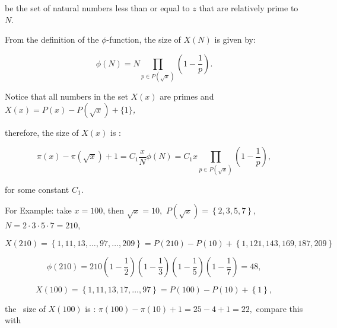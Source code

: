 \documentclass{aomart}
\begin{document}
be the set of natural numbers less than or equal to \(z\) that are relatively prime to \(N\).

\vspace{1\baselineskip}

From the definition of the \( \phi \)-function, the size of \( X(N) \) is given by:

\begin{equation}
\phi\left(N\right) = N\prod_{p\in P\left(\sqrt{x}\right)}^{}(1-\frac{1}{p} )  .
\end{equation}
\vspace{1\baselineskip}

 Notice that all numbers in the set \( X\left(x\right)\) are primes and \( X\left(x\right) = P\left(x\right)- P\left(\sqrt{x}\right)+\{ 1\}\)\textit{,}

 therefore, the { size of }\( X\left(x\right)\) is {:}

\begin{equation}
\pi\left(x\right)-\pi\left(\sqrt{x}\right)+1 = C_{1}\frac{x}{N} \phi\left(N\right) = C_{1}x\prod_{p\in P\left(\sqrt{x}\right)}^{}(1-\frac{1}{p} ) ,
\end{equation}
\vspace{1\baselineskip}

for some constant \( C_{1}\). 
\vspace{1\baselineskip}


For Example:  take  \( x = 100\),  then  \(\sqrt{x} = 10,\) \( P\left(\sqrt{x}\right) =\left\{ 2,3,5,7\right\}\), \( N = 2\cdot 3\cdot 5\cdot 7 = 210\),

\begin{equation}
X\left(210\right) =\left\{  1, 11, 13, \ldots , 97,\ldots ,209\right\}  = P\left(210\right)- P\left(10\right)+\left\{ 1, 121, 143, 169, 187, 209\right\} 
\end{equation}


\begin{equation}
\phi\left(210\right) = 210\left(1-\frac{1}{2}\right)\left(1-\frac{1}{3}\right)\left(1-\frac{1}{5}\right)\left(1-\frac{1}{7}\right) = 48 ,  
\end{equation}


\begin{equation}
X\left(100\right) =\left\{  1, 11, 13, 17, \ldots , 97\right\}  = P\left(100\right)- P\left(10\right)+\left\{ 1\right\} ,
\end{equation}
\vspace{1\baselineskip}

the\  { size of }\( X\left(100\right)\) is {:} \( \pi\left(100\right)-\pi\left(10\right)+1 = 25-4+1 = 22,\) compare this with
\end{document}
